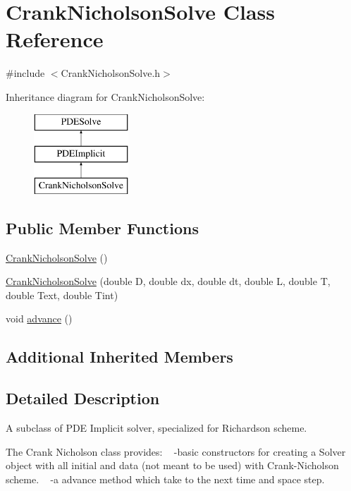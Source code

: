 \hypertarget{class_crank_nicholson_solve}{}\section{Crank\+Nicholson\+Solve Class Reference}
\label{class_crank_nicholson_solve}


{\ttfamily \#include $<$Crank\+Nicholson\+Solve.\+h$>$}

Inheritance diagram for Crank\+Nicholson\+Solve\+:\begin{figure}[H]
\begin{center}
\leavevmode
\includegraphics[height=3.000000cm]{class_crank_nicholson_solve}
\end{center}
\end{figure}
\subsection*{Public Member Functions}
\begin{DoxyCompactItemize}
\item 
\hyperlink{class_crank_nicholson_solve_a2c3330fe7e6925da4148d314280ed021}{Crank\+Nicholson\+Solve} ()
\item 
\hyperlink{class_crank_nicholson_solve_a0608d2d606626bf02c580f87b5a467ed}{Crank\+Nicholson\+Solve} (double D, double dx, double dt, double L, double T, double Text, double Tint)
\item 
void \hyperlink{class_crank_nicholson_solve_a82fe6f2538bc90d62842d26736ba8707}{advance} ()
\end{DoxyCompactItemize}
\subsection*{Additional Inherited Members}


\subsection{Detailed Description}
A subclass of P\+DE Implicit solver, specialized for Richardson scheme.

The Crank Nicholson class provides\+: ~\newline
-\/basic constructors for creating a Solver object with all initial  and data (not meant to be used)  with Crank-\/\+Nicholson scheme. ~\newline
-\/a advance method which take to the next time and space step. 

